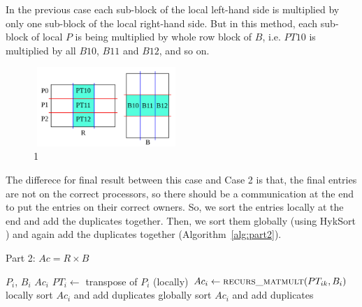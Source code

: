 In the previous case each sub-block of the local left-hand side is multiplied by only one sub-block of the local right-hand side.
But in this method, each sub-block of local $P$ is being multiplied by whole row block of $B$, i.e. $PT10$ is multiplied by all $B10$, $B11$ and $B12$, and so on.

\begin{figure}[tbh]
 \centering
 \includegraphics[width=5.5cm,height=3cm]{./figures/part2e.pdf}
 \caption{1}
 \label{fig:part2e}
\end{figure}

The differece for final result between this case and Case 2 is that, the final entries are not on the correct processors, so there should be a communication at the end to put the entries on their correct owners. So, we sort the entries locally at the end and add the duplicates together. Then, we sort them globally (using HykSort \cite{Sundar:2013}) and again add the duplicates together (Algorithm~\ref{alg:part2}).

\begin{algorithm}[H] 
  \caption{Part 2: $Ac = R \times B$} \label{alg:part2} 
  \begin{algorithmic}[1]
    \Require $P_i$, $B_i$
    \Ensure  $Ac_i$
    \State $PT_i \leftarrow$ transpose of $P_i$ (locally)
      \State $Ac_i \leftarrow \textsc{recurs\_matmult}(PT_{ik}, B_i)$
    \EndFor
    \State locally sort $Ac_i$ and add duplicates
    \State globally sort $Ac_i$ and add duplicates
  \end{algorithmic}
\end{algorithm}

